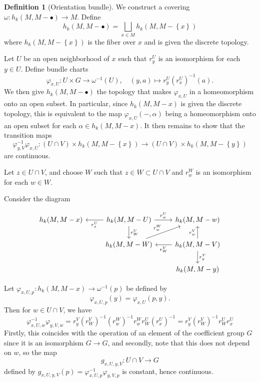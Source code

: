 \documentclass[reqno]{amsart}
\theoremstyle{definition}
\newtheorem{definition}[theorem]{Definition}
\theoremstyle{remark}
\begin{document}
\begin{definition}[Orientation bundle]
    We construct a covering
    $\omega \colon h_k(M, M - \bullet) \to  M$.
    Define
    \[
    h_k(M, M - \bullet) =
    \bigsqcup_{x \in M} 
    h_k(M, M- \left\{ x \right\} )
    \] 
    where $h_k(M, M - \left\{ x \right\} )$ is
    the fiber over $x$ and is given
    the discrete topology.

    Let $U$ be an open neighborhood of
    $x$ such that $r_{y}^{U}$ is an isomorphism
    for each $y \in U$.
    Define bundle charts
    \[
    \varphi_{x,U} \colon U \times G
    \to \omega^{-1} (U), \quad
    (y,a) \mapsto r_y^{U}\left( r_x^{U} \right)^{-1} (a).
    \] 
    We then give $h_k(M, M - \bullet)$ the
    topology that makes
    $\varphi_{x,U}$ in a homeomorphism onto
    an open subset. In particular, since
    $h_k(M,M-x)$ is given the
    discrete topology, this is equivalent to
    the map $\varphi_{x,U}(-,\alpha)$ being a homeomorphism
    onto an open subset for each
    $\alpha \in 
    h_k(M, M- x)$.
    It then remains to show that the transition maps
    \[
    \varphi_{y,V}^{-1} \varphi_{x,U} \colon
    (U \cap V) \times 
    h_k(M, M - \left\{ x \right\} )
    \to \left( U \cap V \right) \times 
    h_k(M, M- \left\{ y \right\} )
    \] 
    are continuous.

    Let $z \in U \cap V$, and choose $W$ such that
    $z \in W \subset U \cap V$ and
    $r_{w}^{W}$ is an isomorphism for each $w \in W$.

    Consider the diagram

    \begin{equation*}
    \begin{tikzcd}
        h_k(M, M - x) & \ar[l, "r_x^{U}"] 
        h_k(M, M -U) \ar[r, "r_w^{U}"] 
        \ar[d, "r_{W}^{U}"] & 
        h_k(M, M - w) \\
        & h_k(M, M -W) \ar[ru, "r_w^{W}"] 
        & h_k(M, M - V) \ar[l, "r_W^{V}"] 
        \ar[u, "r_w^{V}"] \ar[d, "r_y^{V}"] \\
        && h_k(M,M-y)
    \end{tikzcd}
    \end{equation*}

    Let
    $\varphi_{x,U,p} \colon
    h_k(M, M- x) \to 
    \omega^{-1}(p)$ be defined by
    \[
    \varphi_{x,U,p}(y) = 
    \varphi_{x,U}(p,y).
    \] 
    Then for $w \in U \cap V$, we have
    \[
    \varphi_{x,U,w}^{-1}
    \varphi_{y,V,w} = r_y^{V} (r_W^{V})^{-1} (r_w^{W})^{-1}
    r_w^{W} r_{W}^{U} (r_x^{U})^{-1} = 
    r_y^{V} (r_W^{V})^{-1} r_{W}^{U} r_x^{U}
    \] 
    Firstly, this coincides with the operation of
    an element of the coefficient group
    $G$ since it is an isomorphism
    $G \to G$, and secondly, 
    note that this does not depend on $w$,
    so the map
    \[
    g_{x,U,y,V} \colon U \cap V \to 
    G
    \]  
    defined by
    $g_{x,U,y,V}(p) = \varphi_{x,U,p}^{-1}
    \varphi_{y,V,p}$ is constant, hence continuous.\\
    \linebreak
    

\end{definition}
\end{document}
